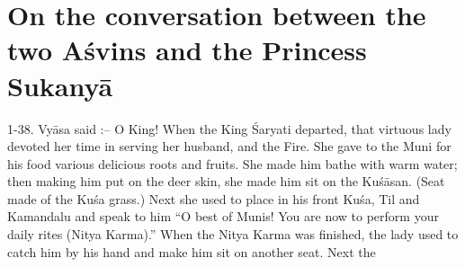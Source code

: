 \chapter{On the conversation between the two A\'svins and the Princess Sukany\=a}

1-38. Vy\=asa said :-- O King! When the King \'Saryati departed, that virtuous lady devoted her time in serving her husband, and the Fire. She gave to the Muni for his food various delicious roots and fruits. She made him bathe with warm water; then making him put on the deer skin, she made him sit on the Ku\'s\=asan. (Seat made of the Ku\'sa grass.) Next she used to place in his front Ku\'sa, Til and Kamandalu and speak to him ``O best of Munis! You are now to perform your daily rites (Nitya Karma).'' When the Nitya Karma was finished, the lady used to catch him by his hand and make him sit on another seat. Next the

